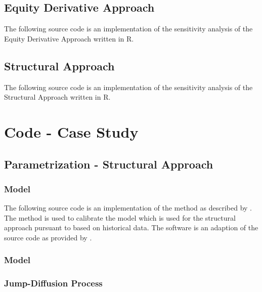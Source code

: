 \section{Equity Derivative Approach} \label{sensiequity}

The following source code is an implementation of the sensitivity analysis of the Equity Derivative Approach \citep{de2011pricing} written in R.
 


\section{Structural Approach} \label{sensistructural}

The following source code is an implementation of the sensitivity analysis of the Structural Approach \citep{pennacchi2010structural} written in R.
 


\chapter{Code - Case Study}

\section{Parametrization - Structural Approach} \label{empirical}


\subsection{\citet{cox1985theory} Model}

The following source code is an implementation of the method as described by \citet{remillard2013statistical}. The method is used to calibrate the \citet{cox1985theory} model which is used for the structural approach pursuant to \citet{pennacchi2010structural} based on historical data. The software is an adaption of the source code as provided by \citet{calibrateCIR}.

\label{estimateCIRParameter}

\subsection{\citet{merton1974pricing} Model}
\label{estimateMertonParameter}

\subsection{Jump-Diffusion Process}
\label{estimateJumpsParameter}


